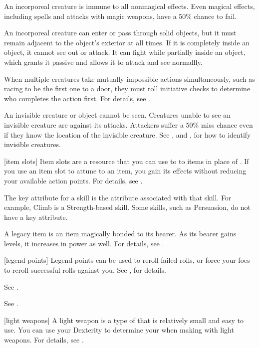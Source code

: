 An incorporeal creature is immune to all nonmagical effects.
Even magical effects, including spells and attacks with magic weapons, have a 50\% chance to fail.

An incorporeal creature can enter or pass through solid objects, but it must remain adjacent to the object's exterior at all times.
If it is completely inside an object, it cannot see out or attack.
It can fight while partially inside an object, which grants it passive  and allows it to attack and see normallly.

 When multiple creatures take mutually impossible actions simultaneously, such as racing to be the first one to a door, they must roll initiative checks to determine who completes the action first.
For details, see .

 An invisible creature or object cannot be seen. Creatures unable to see an invisible creature are  against its attacks. Attackers suffer a 50\% miss chance even if they know the location of the invisible creature. See , and , for how to identify invisible creatures.

[item slots] Item slots are a resource that you can use to  to items in place of .
If you use an item slot to attune to an item, you gain its effects without reducing your available action points.
For details, see .

 The key attribute for a skill is the attribute associated with that skill.
For example, Climb is a Strength-based skill.
Some skills, such as Persuasion, do not have a key attribute.

 A legacy item is an item magically bonded to its bearer.
As its bearer gains levels, it increases in power as well.
For details, see .

[legend points] Legend points can be used to reroll failed rolls, or force your foes to reroll successful rolls against you. See , for details.

 See .

 See .

[light weapons] A light weapon is a type of  that is relatively small and easy to use.
You can use your Dexterity to determine your  when making  with light weapons.
For details, see .

